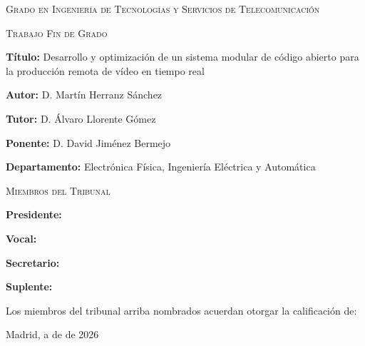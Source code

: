 \begin{titlepage}
\Large{\textsc{\textcolor{nar}{Grado en Ingeniería de Tecnologías y Servicios de Telecomunicación}}} \par
\vspace{0.3cm}
\colorbox{nar}{\Large{\textsc{Trabajo Fin de Grado}}} \par
\vspace{0.2cm}
\normalsize{\textbf{Título:} Desarrollo y optimización de un sistema modular de código abierto para la producción remota de vídeo en tiempo real} \par
\vspace{0.2cm}
\normalsize{\textbf{Autor:} D. Martín Herranz Sánchez} \par
\vspace{0.2cm}
\normalsize{\textbf{Tutor:} D. Álvaro Llorente Gómez} \par
\vspace{0.2cm}
\normalsize{\textbf{Ponente:} D. David Jiménez Bermejo} \par
\vspace{0.2cm}
\normalsize{\textbf{Departamento:} Electrónica Física, Ingeniería Eléctrica y Automática} \par
\vspace{1cm}
\colorbox{nar}{\Large{\textsc{Miembros del Tribunal}}} \par
\vspace{0.2cm}
\normalsize{\textbf{Presidente:} \hspace{4cm}} \par
\vspace{0.2cm}
\normalsize{\textbf{Vocal:} \hspace{4cm}} \par
\vspace{0.2cm}
\normalsize{\textbf{Secretario:} \hspace{4cm}} \par
\vspace{0.2cm}
\normalsize{\textbf{Suplente:} \hspace{4cm}} \par
\vspace{0.8cm}
\normalsize{\quad \quad \quad Los miembros del tribunal arriba nombrados acuerdan otorgar la calificación de: \hspace{2cm}} \par
\vspace{2cm}
\flushright
\normalsize{Madrid, a \quad \quad\quad de \quad \quad\quad\quad\quad\quad\quad de 2026} \par
\end{titlepage}

